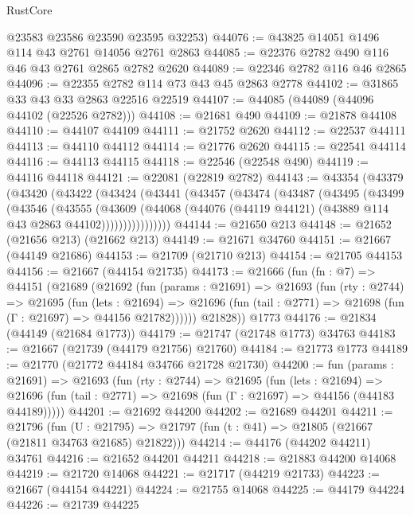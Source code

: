 \begin{lexlean}{RustCore}
\begin{coremodule}
      @23583
      @23586
      @23590
      @23595
      @32253)
@44076 := @43825 @14051 @1496 @114 @43 @2761 @14056 @2761 @2863
@44085 := @22376 @2782 @490 @116 @46 @43 @2761 @2865 @2782 @2620
@44089 := @22346 @2782 @116 @46 @2865
@44096 := @22355 @2782 @114 @73 @43 @45 @2863 @2778
@44102 := @31865 @33 @43 @33 @2863 @22516 @22519
@44107 := @44085 (@44089 (@44096 @44102 (@22526 @2782)))
@44108 := @21681 @490
@44109 := @21878 @44108
@44110 := @44107 @44109
@44111 := @21752 @2620
@44112 := @22537 @44111
@44113 := @44110 @44112
@44114 := @21776 @2620
@44115 := @22541 @44114
@44116 := @44113 @44115
@44118 := @22546 (@22548 @490)
@44119 := @44116 @44118
@44121 := @22081 (@22819 @2782)
@44143 := @43354
    (@43379
      (@43420
        (@43422
          (@43424
            (@43441
              (@43457
                (@43474
                  (@43487
                    (@43495
                      (@43499
                        (@43546
                          (@43555
                            (@43609
                              (@44068
                                (@44076
                                  (@44119 @44121)
                                  (@43889 @114 @43 @2863 @44102))))))))))))))))
@44144 := @21650 @213
@44148 := @21652 (@21656 @213) (@21662 @213)
@44149 := @21671 @34760
@44151 := @21667 (@44149 @21686)
@44153 := @21709 (@21710 @213)
@44154 := @21705 @44153
@44156 := @21667 (@44154 @21735)
@44173 := @21666
    (fun (fn : @7) =>
    @44151
      (@21689
        (@21692
          (fun (params : @21691) =>
          @21693
            (fun (rty : @2744) =>
            @21695
              (fun (lets : @21694) =>
              @21696 (fun (tail : @2771) => @21698 (fun (Γ : @21697) => @44156 @21782))))))
        @21828))
    @1773
@44176 := @21834 (@44149 (@21684 @1773))
@44179 := @21747 (@21748 @1773) @34763
@44183 := @21667 (@21739 (@44179 @21756) @21760)
@44184 := @21773 @1773
@44189 := @21770 (@21772 @44184 @34766 @21728 @21730)
@44200 := fun (params : @21691) =>
  @21693
    (fun (rty : @2744) =>
    @21695
      (fun (lets : @21694) =>
      @21696 (fun (tail : @2771) => @21698 (fun (Γ : @21697) => @44156 (@44183 @44189)))))
@44201 := @21692 @44200
@44202 := @21689 @44201
@44211 := @21796
    (fun (U : @21795) => @21797 (fun (t : @41) => @21805 (@21667 (@21811 @34763 @21685) @21822)))
@44214 := @44176 (@44202 @44211) @34761
@44216 := @21652 @44201 @44211
@44218 := @21883 @44200 @14068
@44219 := @21720 @14068
@44221 := @21717 (@44219 @21733)
@44223 := @21667 (@44154 @44221)
@44224 := @21755 @14068
@44225 := @44179 @44224
@44226 := @21739 @44225

\end{coremodule}
\end{lexlean}
